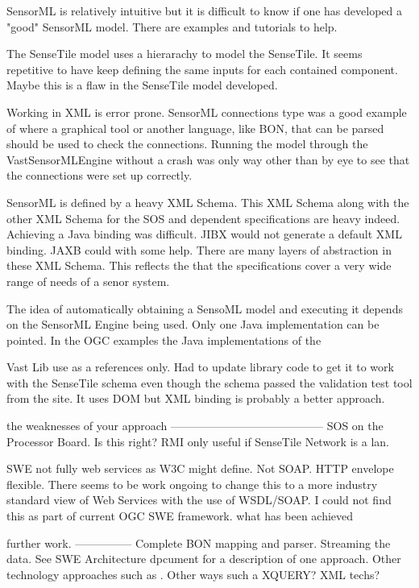\documentclass[]{final_report}
\begin{document}
SensorML is relatively intuitive but it is difficult to know if one has developed a "good" SensorML model. There are examples and tutorials to help. 

The SenseTile model uses a hierarachy to model the SenseTile. It seems repetitive to have keep defining the same inputs for each contained component. Maybe this is a flaw in the SenseTile model developed.

Working in XML is error prone. SensorML connections type was a good example of where a graphical tool or another language, like BON,  that can be parsed should be used to check the connections. Running the model through the VastSensorMLEngine without a crash was only way other than by eye to see that the connections were set up correctly. 

SensorML is defined by a heavy XML Schema. This XML Schema along with the other XML Schema for the SOS and dependent specifications are heavy indeed. Achieving a Java binding was difficult. JIBX would not generate a default XML binding. JAXB could with some help. There are many layers of abstraction in these XML Schema. This reflects the that the specifications cover a very wide range of needs of a senor system.

The idea of automatically obtaining a SensoML model and executing it depends on the SensorML Engine being used. Only one Java implementation can be pointed. In the OGC examples the Java implementations of the 

Vast Lib use as a references only.
Had to update library code to get it to work with the SenseTile schema even though the schema
passed the validation test tool from the site. It uses DOM but XML binding is probably a better approach.


the weaknesses of your approach
-----------------------------------------
SOS on the Processor Board. Is this right? RMI only useful if SenseTile Network is a lan.


SWE not fully web services as W3C might define. Not SOAP. HTTP envelope
flexible. There seems to be work ongoing to change this to a more industry standard view of Web Services with the use of WSDL/SOAP. I could not find this as part of current OGC SWE framework.
what has been achieved


further work.
---------------
Complete BON mapping and parser.
Streaming the data. See SWE Architecture dpcument for a description of one approach.
Other technology approaches such as . Other ways such a XQUERY? XML techs?
\end{document}
